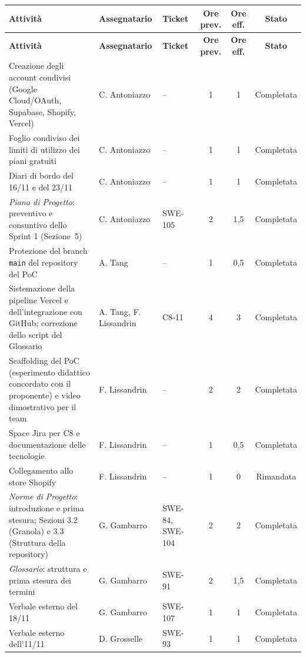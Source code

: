 {\small
\renewcommand{\arraystretch}{1.3}
\setlength{\tabcolsep}{4pt}
\setlength{\LTpre}{2mm}
\noindent
\begin{xltabular}{\textwidth}{|>{\raggedright\arraybackslash}X >{\raggedright\arraybackslash}p{2.3cm} >{\raggedright\arraybackslash}p{1.6cm} c c c|}
\hline
\textbf{Attività} & \textbf{Assegnatario} & \textbf{Ticket} & \textbf{Ore prev.} & \textbf{Ore eff.} & \textbf{Stato} \\
\hline
\endfirsthead
\hline
\textbf{Attività} & \textbf{Assegnatario} & \textbf{Ticket} & \textbf{Ore prev.} & \textbf{Ore eff.} & \textbf{Stato} \\
\hline
\endhead
\hline
\endfoot
Creazione degli account condivisi (Google Cloud/OAuth, Supabase, Shopify, Vercel) & C. Antoniazzo & -- & 1 & 1 & Completata \\
Foglio condiviso dei limiti di utilizzo dei piani gratuiti & C. Antoniazzo & -- & 1 & 1 & Completata \\
Diari di bordo del 16/11 e del 23/11 & C. Antoniazzo & -- & 1 & 1 & Completata \\
\textit{Piano di Progetto}: preventivo e consuntivo dello Sprint 1 (Sezione~5) & C. Antoniazzo & SWE-105 & 2 & 1,5 & Completata \\
Protezione del branch \texttt{main} del repository del PoC & A. Tang & -- & 1 & 0,5 & Completata \\
Sistemazione della pipeline Vercel e dell'integrazione con GitHub; correzione dello script del Glossario & A. Tang, F. Lissandrin & C8-11 & 4 & 3 & Completata \\
Scaffolding del PoC (esperimento didattico concordato con il proponente) e video dimostrativo per il team & F. Lissandrin & -- & 2 & 2 & Completata \\
Space Jira per C8 e documentazione delle tecnologie & F. Lissandrin & -- & 1 & 0,5 & Completata \\
Collegamento allo store Shopify & F. Lissandrin & -- & 1 & 0 & Rimandata \\
\textit{Norme di Progetto}: introduzione e prima stesura; Sezioni 3.2 (Granola) e 3.3 (Struttura della repository) & G. Gambarro & SWE-84, SWE-104 & 2 & 2 & Completata \\
\textit{Glossario}: struttura e prima stesura dei termini & G. Gambarro & SWE-91 & 2 & 1,5 & Completata \\
Verbale esterno del 18/11 & G. Gambarro & SWE-107 & 1 & 1 & Completata \\
Verbale esterno dell'11/11 & D. Grosselle & SWE-93 & 1 & 1 & Completata \\

\end{xltabular}}
